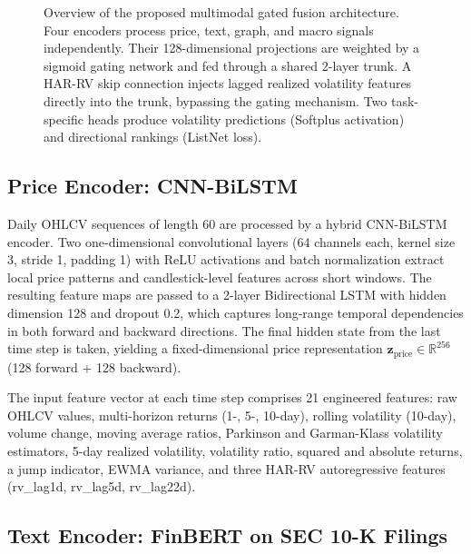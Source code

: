 \documentclass[12pt, a4paper]{article}
\begin{document}
\begin{figure}[H]
    \caption{Overview of the proposed multimodal gated fusion architecture. Four encoders process price, text, graph, and macro signals independently. Their 128-dimensional projections are weighted by a sigmoid gating network and fed through a shared 2-layer trunk. A HAR-RV skip connection injects lagged realized volatility features directly into the trunk, bypassing the gating mechanism. Two task-specific heads produce volatility predictions (Softplus activation) and directional rankings (ListNet loss).}
    \label{fig:arch}
\end{figure}

\subsection{Price Encoder: CNN-BiLSTM}

Daily OHLCV sequences of length 60 are processed by a hybrid CNN-BiLSTM encoder. Two one-dimensional convolutional layers (64 channels each, kernel size 3, stride 1, padding 1) with ReLU activations and batch normalization extract local price patterns and candlestick-level features across short windows. The resulting feature maps are passed to a 2-layer Bidirectional LSTM with hidden dimension 128 and dropout 0.2, which captures long-range temporal dependencies in both forward and backward directions. The final hidden state from the last time step is taken, yielding a fixed-dimensional price representation $\mathbf{z}_{\text{price}} \in \mathbb{R}^{256}$ (128 forward + 128 backward).

The input feature vector at each time step comprises 21 engineered features: raw OHLCV values, multi-horizon returns (1-, 5-, 10-day), rolling volatility (10-day), volume change, moving average ratios, Parkinson and Garman-Klass volatility estimators, 5-day realized volatility, volatility ratio, squared and absolute returns, a jump indicator, EWMA variance, and three HAR-RV autoregressive features (rv\_lag1d, rv\_lag5d, rv\_lag22d).

\subsection{Text Encoder: FinBERT on SEC 10-K Filings}
\end{document}
